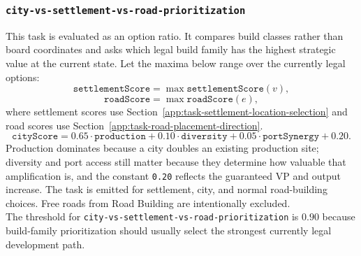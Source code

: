\documentclass{article}
\begin{document}
\subsubsection{\texttt{city-vs-settlement-vs-road-prioritization}}
\label{app:task-city-vs-settlement-vs-road-prioritization}
This task is evaluated as an option ratio.
It compares build classes rather than board coordinates and asks which legal build family has the highest strategic value at the current state. Let the maxima below range over the currently legal options:
\[
\texttt{settlementScore} = \max \texttt{settlementScore}(v),
\]
\[
\texttt{roadScore} = \max \texttt{roadScore}(e),
\]
where settlement scores use Section~\ref{app:task-settlement-location-selection} and road scores use Section~\ref{app:task-road-placement-direction}.
\[
\texttt{cityScore}
= 0.65 \cdot \texttt{production}
+ 0.10 \cdot \texttt{diversity}
+ 0.05 \cdot \texttt{portSynergy}
+ 0.20.
\]
Production dominates because a city doubles an existing production site; diversity and port access still matter because they determine how valuable that amplification is, and the constant \texttt{0.20} reflects the guaranteed VP and output increase.
The task is emitted for settlement, city, and normal road-building choices. Free roads from Road Building are intentionally excluded.
\\
The threshold for \texttt{city-vs-settlement-vs-road-prioritization} is $0.90$ because build-family prioritization should usually select the strongest currently legal development path.
\end{document}
